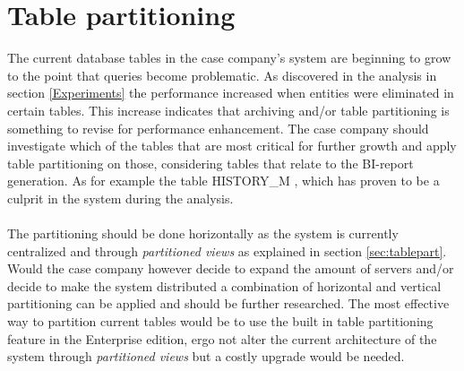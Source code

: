 \documentclass{cslthse-msc}
\begin{document}
\section{Table partitioning}
The current database tables in the case company's system are beginning to grow to the point that queries become problematic. As discovered in the analysis in section \ref{Experiments} the performance increased when entities were eliminated in certain tables. This increase indicates that archiving and/or table partitioning is something to revise for performance enhancement.
The case company should investigate which of the tables that are most critical for further growth and apply table partitioning on those, considering tables that relate to the BI-report generation. As for example the table HISTORY\_M , which has proven to be a culprit in the system during the analysis.\\\\
The partitioning should be done horizontally as the system is currently centralized and through \textit{partitioned views} as explained in section \ref{sec:tablepart}. Would the case company however decide to expand the amount of servers and/or decide to make the system distributed a combination of horizontal and vertical partitioning can be applied and should be further researched. The most effective way to partition current tables would be to use the built in table partitioning feature in the Enterprise edition, ergo not alter the current architecture of the system through \textit{partitioned views} but a costly upgrade would be needed.
\end{document}
